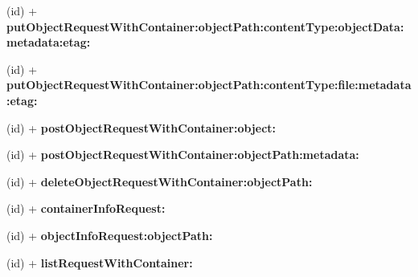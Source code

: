\begin{DoxyCompactItemize}
\item 
\hypertarget{interface_a_s_i_cloud_files_object_request_a51fd51b32cb64756aa6fbc3f50ff7df4}{
(id) + {\bfseries put\-Object\-Request\-With\-Container\-:object\-Path\-:content\-Type\-:object\-Data\-:metadata\-:etag\-:}}
\label{interface_a_s_i_cloud_files_object_request_a51fd51b32cb64756aa6fbc3f50ff7df4}

\item 
\hypertarget{interface_a_s_i_cloud_files_object_request_a4fd2c82bc1702341d5a482f7ff46db4b}{
(id) + {\bfseries put\-Object\-Request\-With\-Container\-:object\-Path\-:content\-Type\-:file\-:metadata\-:etag\-:}}
\label{interface_a_s_i_cloud_files_object_request_a4fd2c82bc1702341d5a482f7ff46db4b}

\item 
\hypertarget{interface_a_s_i_cloud_files_object_request_ae713a0e0f7867895b33210be74770c47}{
(id) + {\bfseries post\-Object\-Request\-With\-Container\-:object\-:}}
\label{interface_a_s_i_cloud_files_object_request_ae713a0e0f7867895b33210be74770c47}

\item 
\hypertarget{interface_a_s_i_cloud_files_object_request_a594d1d7c8fc812dc9acc2c862809b603}{
(id) + {\bfseries post\-Object\-Request\-With\-Container\-:object\-Path\-:metadata\-:}}
\label{interface_a_s_i_cloud_files_object_request_a594d1d7c8fc812dc9acc2c862809b603}

\item 
\hypertarget{interface_a_s_i_cloud_files_object_request_a55f1c9c4f71e7e3314b23d144b96fbac}{
(id) + {\bfseries delete\-Object\-Request\-With\-Container\-:object\-Path\-:}}
\label{interface_a_s_i_cloud_files_object_request_a55f1c9c4f71e7e3314b23d144b96fbac}

\item 
\hypertarget{interface_a_s_i_cloud_files_object_request_ab9af59ae6c15be52c702e45fca805db9}{
(id) + {\bfseries container\-Info\-Request\-:}}
\label{interface_a_s_i_cloud_files_object_request_ab9af59ae6c15be52c702e45fca805db9}

\item 
\hypertarget{interface_a_s_i_cloud_files_object_request_a4b4f0ea695cdec431818f4ca24a8a1cf}{
(id) + {\bfseries object\-Info\-Request\-:object\-Path\-:}}
\label{interface_a_s_i_cloud_files_object_request_a4b4f0ea695cdec431818f4ca24a8a1cf}

\item 
\hypertarget{interface_a_s_i_cloud_files_object_request_ad140f7f65fef97218ff5a8853afbc0c7}{
(id) + {\bfseries list\-Request\-With\-Container\-:}}
\label{interface_a_s_i_cloud_files_object_request_ad140f7f65fef97218ff5a8853afbc0c7}


\end{DoxyCompactItemize}
